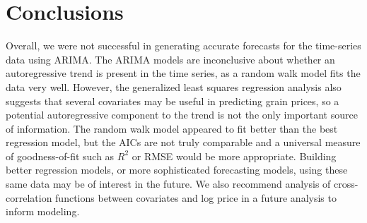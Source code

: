 \documentclass[11pt]{article}
\begin{document}
\section*{Conclusions}

Overall, we were not successful in generating accurate forecasts for the
time-series data using ARIMA. The ARIMA models are inconclusive about whether
an autoregressive trend is present in the time series, as a random walk model
fits the data very well. However, the generalized least squares regression
analysis also suggests that several covariates may be useful in predicting
grain prices, so a potential autoregressive component to the trend is not the
only important source of information. The random walk model appeared to fit
better than the best regression model, but the AICs are not truly comparable
and a universal measure of goodness-of-fit such as $R^2$ or RMSE would be more
appropriate. Building better regression models, or
more sophisticated forecasting models, using these same data may be of interest
in the future. We also recommend analysis of cross-correlation functions
between covariates and log price in a future analysis to inform modeling.

\newpage


\end{document}
